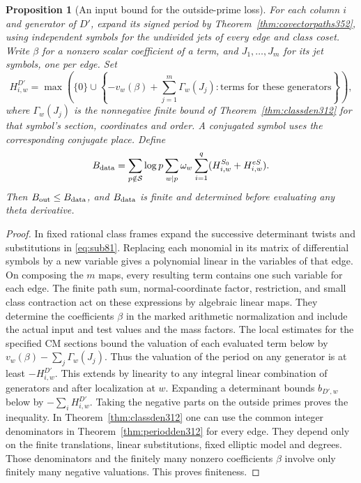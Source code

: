 \documentclass[a4paper,11pt]{article}
\newtheorem{proposition}{Proposition}[section]
\theoremstyle{definition}
\theoremstyle{remark}
\numberwithin{equation}{section}
\begin{document}
\begin{proposition}[An input bound for the outside-prime loss]\leavevmode
\label{prop:outsidewordcost451}
For each column \(i\) and generator of \(D'\), expand its signed
period by Theorem~\ref{thm:covectorpaths352}, using independent
symbols for the undivided jets of every edge and class coset.
Write \(\beta\) for a nonzero scalar coefficient of a term, and
\(J_1,\ldots,J_m\) for its jet symbols, one per edge. Set
\[
 H^{D'}_{i,w}=
 \max\left(\{0\}\cup
 \left\{-v_w(\beta)+\sum_{j=1}^m\Gamma_w(J_j):
             \text{terms for these generators}\right\}\right),
\]
where \(\Gamma_w(J_j)\) is the nonnegative finite bound of
Theorem~\ref{thm:classden312} for that symbol's section, coordinates
and order. A conjugated symbol uses the corresponding conjugate
place. Define
\[
 B_{\rm data}=
   \sum_{p\notin\mathcal S}\log p\sum_{w\mid p}\omega_w
      \sum_{i=1}^q(H^{S_0}_{i,w}+H^{eS}_{i,w}).
\]
Then \(B_{\rm out}\le B_{\rm data}\), and \(B_{\rm data}\) is
finite and determined before evaluating any theta derivative.
\end{proposition}
\begin{proof}
In fixed rational class frames expand the successive determinant
twists and substitutions in \eqref{eq:sub81}. Replacing each
monomial in its matrix of differential symbols by a new variable
gives a polynomial linear in the variables of that edge.
On composing the \(m\) maps, every resulting term contains one
such variable for each edge. The finite path sum, normal-coordinate
factor, restriction, and small class contraction act on these
expressions by algebraic linear maps. They determine the coefficients
\(\beta\) in the marked arithmetic normalization and include the
actual input and test values and the mass factors. The local
estimates for the specified CM sections bound the valuation of
each evaluated term below by \(v_w(\beta)-\sum_j\Gamma_w(J_j)\).
Thus the valuation of the period on any generator is at least
\(-H^{D'}_{i,w}\). This extends by linearity to any integral
linear combination of generators and after localization at \(w\).
Expanding a determinant bounds \(b_{D',w}\) below by
\(-\sum_i H^{D'}_{i,w}\). Taking the negative parts on the
outside primes proves the inequality. In
Theorem~\ref{thm:classden312} one can use the common integer
denominators in Theorem~\ref{thm:periodden312} for every edge.
They depend only on the finite translations, linear substitutions,
fixed elliptic model and degrees. Those denominators and the
finitely many nonzero coefficients \(\beta\) involve only finitely
many negative valuations. This proves finiteness.
\end{proof}
\end{document}
